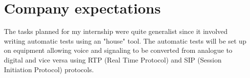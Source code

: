 \section{Company expectations}
The tasks planned for my internship were quite generalist since it
involved writing automatic tests using an "house" tool. The automatic
tests will be set up on equipment allowing voice and signaling to be
converted from analogue to digital and vice versa using RTP (Real Time Protocol) and SIP
(Session Initiation Protocol) protocols.